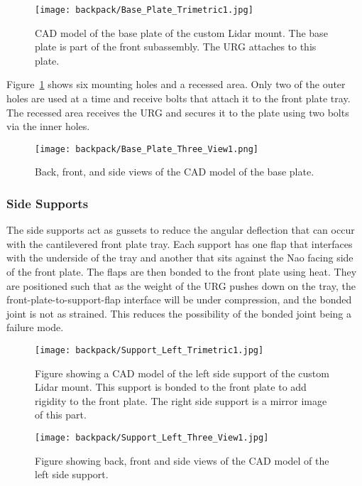 \begin{figure}
\centering
\texttt{[image: backpack/Base\_Plate\_Trimetric1.jpg]}
\caption{CAD model of the base plate of the custom Lidar
         mount. The base plate is part of the front subassembly.
         The URG attaches to this plate.}
\label{fig:nao_lidar_mount_baseplate_trimetric1}
\end{figure}

Figure~\ref{fig:nao_lidar_mount_baseplate_trimetric1} shows six mounting holes
and a recessed area. Only two of the outer holes are used at a time and receive
bolts that attach it to the front plate tray. The recessed area receives the URG
and secures it to the plate using two bolts via the inner holes.

\begin{figure}
\centering
\texttt{[image: backpack/Base\_Plate\_Three\_View1.png]}
\caption{Back, front, and side views of the CAD model of the
         base plate.}
\label{fig:nao_lidar_mount_baseplate_three_view1}
\end{figure}


\subsubsection{Side Supports}
The side supports act as gussets to reduce the angular deflection that can
occur with the cantilevered front plate tray. Each support has one flap
that interfaces with the underside of the tray and another that sits against
the Nao facing side of the front plate. The flaps are then bonded to the front
plate using heat. They are positioned such that as the weight of the URG pushes
down on the tray, the front-plate-to-support-flap interface will be under
compression, and the bonded joint is not as strained. This reduces the possibility
of the bonded joint being a failure mode.

\begin{figure}
\centering
\texttt{[image: backpack/Support\_Left\_Trimetric1.jpg]}
\caption{Figure showing a CAD model of the left side support of the custom
         Lidar mount. This support is bonded to the front plate to add rigidity
         to the front plate. The right side support is a mirror image of this
         part.}
\label{fig:nao_lidar_mount_supportleft_trimetric1}
\end{figure}

\begin{figure}
\centering
\texttt{[image: backpack/Support\_Left\_Three\_View1.jpg]}
\caption{Figure showing back, front and side views of the CAD model of the left
         side support.}
\label{fig:nao_lidar_mount_supportleft_three_view1}
\end{figure}


